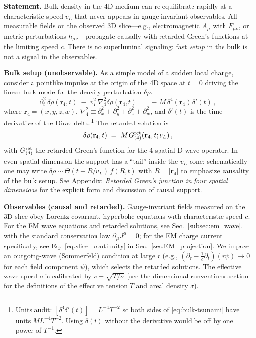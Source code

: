 \textbf{Statement.} Bulk density in the 4D medium can re-equilibrate rapidly at a characteristic speed $v_L$ that never appears in gauge-invariant observables. All measurable fields on the observed 3D slice---e.g., electromagnetic $A_\mu$ with $F_{\mu\nu}$, or metric perturbations $h_{\mu\nu}$---propagate causally with retarded Green's functions at the limiting speed $c$. There is no superluminal signaling: fast \emph{setup} in the bulk is not a signal in the observables.

\medskip
\noindent\textbf{Bulk setup (unobservable).} As a simple model of a sudden local change, consider a pointlike impulse at the origin of the 4D space at $t=0$ driving the linear bulk mode for the density perturbation $\delta\rho$:
\begin{equation}
\partial_t^2 \,\delta\rho(\mathbf r_4,t)\;-\; v_L^2 \,\nabla_4^2 \delta\rho(\mathbf r_4,t)
\;=\; -\,M\,\delta^4(\mathbf r_4)\,\delta'(t)\,,
\label{eq:bulk-tsunami}
\end{equation}
where $\mathbf r_4=(x,y,z,w)$, $\nabla_4^2\!\equiv\!\partial_x^2{+}\partial_y^2{+}\partial_z^2{+}\partial_w^2$, and $\delta'(t)$ is the time derivative of the Dirac delta.\footnote{Units audit: $[\delta^4\delta'(t)]=L^{-4}T^{-2}$ so both sides of \eqref{eq:bulk-tsunami} have units $ML^{-4}T^{-2}$. Using $\delta(t)$ without the derivative would be off by one power of $T^{-1}$.}
The retarded solution is
\begin{equation}
\delta\rho(\mathbf r_4,t)\;=\;M\,G^{\rm ret}_{(4)}(\mathbf r_4,t;v_L)\,,
\end{equation}
with $G^{\rm ret}_{(4)}$ the retarded Green's function for the 4-spatial-D wave operator. In even spatial dimension the support has a ``tail'' inside the $v_L$ cone; schematically one may write $\delta\rho \sim \Theta(t{-}R/v_L)\,f(R,t)$ with $R=|\mathbf r_4|$ to emphasize causality of the bulk setup. See Appendix: \emph{Retarded Green's function in four spatial dimensions} for the explicit form and discussion of causal support.

\medskip
\noindent\textbf{Observables (causal and retarded).} Gauge-invariant fields measured on the 3D slice obey Lorentz-covariant, hyperbolic equations with characteristic speed $c$. For the EM wave equations and retarded solutions, see Sec.~\ref{subsec:em_wave}.
with the standard conservation law $\partial_\mu J^\mu=0$; for the EM charge current specifically, see Eq.~\ref{eq:slice_continuity} in Sec.~\ref{sec:EM_projection}. We impose an outgoing-wave (Sommerfeld) condition at large $r$ (e.g., $(\partial_r-\tfrac1c\partial_t)(r\psi)\!\to\!0$ for each field component $\psi$), which selects the retarded solutions. The effective wave speed $c$ is calibrated by $c=\sqrt{T/\sigma}$ (see the dimensional conventions section for the definitions of the effective tension $T$ and areal density $\sigma$).

